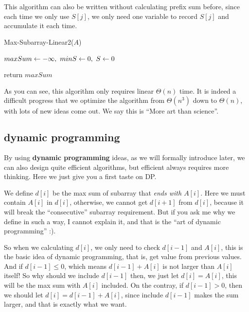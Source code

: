 \documentclass[11pt, a4paper]{COMP3711}
\begin{document}
\begin{spacing}{1.5}
    This algorithm can also be written without calculating prefix sum 
    before, since each time we only use $S[j]$, we only need one
    variable to record $S[j]$ and accumulate it each time.

    \begin{algorithm}
        \caption{Max-Subarray-Linear2($A$)}
        $maxSum \leftarrow -\infty,\ minS\leftarrow 0,\ S\leftarrow 0$

        return $maxSum$
    \end{algorithm}

    As you can see, this algorithm only requires linear $\Theta(n)$ time.
    It is indeed a difficult progress that we optimize the algorithm 
    from $\Theta(n^3)$ down to $\Theta(n)$, with lots of new ideas 
    come out. We say this is ``More art than science''.

    \subsection{dynamic programming}

    By using {\bf dynamic programming} ideas, as we will formally 
    introduce later, we can also design quite efficient algorithms,
    but efficient always requires more thinking.
    Here we just give you a first taste on DP.

    We define $d[i]$ be the max sum of subarray that {\it 
    ends with $A[i]$}. Here we must contain $A[i]$ in 
    $d[i]$, otherwise, we cannot get $d[i+1]$ from $d[i]$,
    because it will break the ``consecutive'' subarray requirement.
    But if you ask me why we define in such a way, I cannot 
    explain it, and that is the ``art of dynamic programming'' :).

    So when we calculating $d[i]$, we only need to check $d[i-1]$
    and $A[i]$, this is the basic idea of dynamic programming, 
    that is, get value from previous values.
    And if $d[i-1]\le 0$, which means $d[i-1]+A[i]$ is not larger than 
    $A[i]$ itself! So why should we include $d[i-1]$ then, 
    we just let $d[i]=A[i]$, this will be the max sum with 
    $A[i]$ included.
    On the contray, if $d[i-1]>0$, then we should let 
    $d[i]=d[i-1]+A[i]$, since include $d[i-1]$ makes the sum 
    larger, and that is exactly what we want.


\end{spacing}
\end{document}
